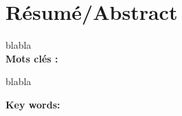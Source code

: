 \newpage
\chapter*{Résumé/Abstract}
\begin{center}
\textbf{\titrerapport}
\end{center}
 blabla
\\
\textbf{Mots clés :} 
\\
\HRule

\begin{center}
\textbf{\titreanglais}
\end{center}
\noindent %


blabla


\noindent
\textbf{Key words:} 
